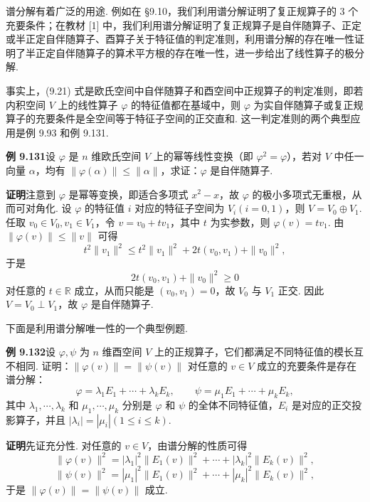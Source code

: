 \documentclass[UTF8,12pt,a4paper,fontset=fandol]{ctexart}
\begin{document}
谱分解有着广泛的用途. 例如在 §9.10，我们利用谱分解证明了复正规算子的 $3$ 个充要条件；在教材 [1] 中，我们利用谱分解证明了复正规算子是自伴随算子、正定或半正定自伴随算子、酉算子关于特征值的判定准则，利用谱分解的存在唯一性证明了半正定自伴随算子的算术平方根的存在唯一性，进一步给出了线性算子的极分解.

事实上，(9.21) 式是欧氏空间中自伴随算子和酉空间中正规算子的判定准则，即若内积空间 $V$ 上的线性算子 $\varphi$ 的特征值都在基域中，则 $\varphi$ 为实自伴随算子或复正规算子的充要条件是全空间等于特征子空间的正交直和. 这一判定准则的两个典型应用是例 9.93 和例 9.131.

\noindent\textbf{例 9.131}\quad 设 $\varphi$ 是 $n$ 维欧氏空间 $V$ 上的幂等线性变换（即 $\varphi^2=\varphi$），若对 $V$ 中任一向量 $\alpha$，均有 $\|\varphi(\alpha)\|\le\|\alpha\|$，求证：$\varphi$ 是自伴随算子.

\noindent\textbf{证明}\quad 注意到 $\varphi$ 是幂等变换，即适合多项式 $x^2-x$，故 $\varphi$ 的极小多项式无重根，从而可对角化. 设 $\varphi$ 的特征值 $i$ 对应的特征子空间为 $V_i(i=0,1)$，则 $V=V_0\oplus V_1$. 任取 $v_0\in V_0,v_1\in V_1$，令 $v=v_0+tv_1$，其中 $t$ 为实参数，则 $\varphi(v)=tv_1$. 由 $\|\varphi(v)\|\le\|v\|$ 可得
\[
t^2\|v_1\|^2\le t^2\|v_1\|^2+2t(v_0,v_1)+\|v_0\|^2,
\]
于是
\[
2t(v_0,v_1)+\|v_0\|^2\ge0
\]
对任意的 $t\in\mathbb{R}$ 成立，从而只能是 $(v_0,v_1)=0$，故 $V_0$ 与 $V_1$ 正交. 因此 $V=V_0\perp V_1$，故 $\varphi$ 是自伴随算子.

下面是利用谱分解唯一性的一个典型例题.

\noindent\textbf{例 9.132}\quad 设 $\varphi,\psi$ 为 $n$ 维酉空间 $V$ 上的正规算子，它们都满足不同特征值的模长互不相同. 证明：$\|\varphi(v)\|=\|\psi(v)\|$ 对任意的 $v\in V$ 成立的充要条件是存在谱分解：
\[
\varphi=\lambda_1E_1+\cdots+\lambda_kE_k,\qquad
\psi=\mu_1E_1+\cdots+\mu_kE_k,
\]
其中 $\lambda_1,\cdots,\lambda_k$ 和 $\mu_1,\cdots,\mu_k$ 分别是 $\varphi$ 和 $\psi$ 的全体不同特征值，$E_i$ 是对应的正交投影算子，并且 $|\lambda_i|=|\mu_i|(1\le i\le k)$.

\noindent\textbf{证明}\quad 先证充分性. 对任意的 $v\in V$，由谱分解的性质可得
\[
\|\varphi(v)\|^2=|\lambda_1|^2\|E_1(v)\|^2+\cdots+|\lambda_k|^2\|E_k(v)\|^2,
\]
\[
\|\psi(v)\|^2=|\mu_1|^2\|E_1(v)\|^2+\cdots+|\mu_k|^2\|E_k(v)\|^2,
\]
于是 $\|\varphi(v)\|=\|\psi(v)\|$ 成立.
\end{document}
